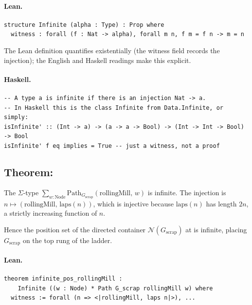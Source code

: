 \documentclass[11pt,a4paper]{article}
\begin{document}
\paragraph{Lean.}
\begin{lstlisting}[style=lean]
structure Infinite (alpha : Type) : Prop where
  witness : forall (f : Nat -> alpha), forall m n, f m = f n -> m = n
\end{lstlisting}

\begin{fidelitynote}
The Lean definition quantifies existentially (the witness field records the
injection); the English and Haskell readings make this explicit.
\end{fidelitynote}

\paragraph{Haskell.}
\begin{lstlisting}[style=haskell]
-- A type a is infinite if there is an injection Nat -> a.
-- In Haskell this is the class Infinite from Data.Infinite, or simply:
isInfinite' :: (Int -> a) -> (a -> a -> Bool) -> (Int -> Int -> Bool) -> Bool
isInfinite' f eq implies = True -- just a witness, not a proof
\end{lstlisting}


\subsection{Theorem: }

\begin{thm}
The $\Sigma$-type $\sum_{w : \mathrm{Node}} \mathrm{Path}_{G_{\mathrm{scrap}}}(\mathrm{rollingMill},\, w)$
is infinite.  The injection is $n \mapsto (\mathrm{rollingMill},\, \mathrm{laps}(n))$,
which is injective because $\mathrm{laps}(n)$ has length $2n$, a strictly
increasing function of $n$.

Hence the position set of the directed container $\mathcal{N}(G_{\mathrm{scrap}})$
at  is infinite, placing $G_{\mathrm{scrap}}$ on the top rung
of the ladder.
\end{thm}

\paragraph{Lean.}
\begin{lstlisting}[style=lean]
theorem infinite_pos_rollingMill :
    Infinite ((w : Node) * Path G_scrap rollingMill w) where
  witness := forall (n => <|rollingMill, laps n|>), ...
\end{lstlisting}
\end{document}
